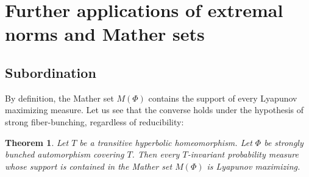 \documentclass[JEP,XML,SOM,Unicode]{cedram}
\theoremstyle{plain}
\newtheorem{theorem}{Theorem}[section]
\theoremstyle{definition}
\begin{document}
\section{Further applications of extremal norms and Mather sets}\label{s.app}

\subsection{Subordination}\label{ss.subordination}

By definition, the Mather set $M(\Phi)$ contains the support of every Lyapunov maximizing measure. Let us see that the converse holds under the hypothesis of strong fiber-bunching, regardless of reducibility:

\begin{theorem}\label{t.subordination}
Let $T$ be a transitive hyperbolic homeomorphism.
Let $\Phi$ be strongly bunched automorphism covering $T$.
Then every $T$-invariant probability measure whose support is contained in the Mather set $M(\Phi)$ is Lyapunov maximizing.
\end{theorem}
\end{document}
